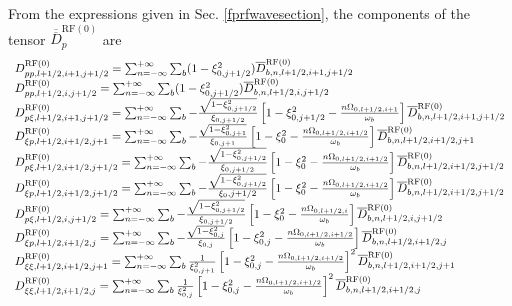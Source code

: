 From the expressions given in Sec. \ref{fprfwavesection}, the
components of the tensor
$\overline{\overline{D}}_{p}^{\text{RF}\left( 0\right) }$ are
\begin{equation}
\begin{array}{l}
D_{pp,l+1/2,i+1,j+1/2}^{\text{RF}\left( 0\right) }=\sum_{n=-\infty }^{+%
\infty }\sum_{b}(1-\xi _{0,j+1/2}^{2})\overline{D}_{b,n,l+1/2,i+1,j+1/2}^{%
\text{RF}(0)} \\
D_{pp,l+1/2,i,j+1/2}^{\text{RF}\left( 0\right) }=\sum_{n=-\infty }^{+\infty %
}\sum_{b}(1-\xi _{0,j+1/2}^{2})\overline{D}_{b,n,l+1/2,i,j+1/2}^{\text{RF}%
(0)} \\
D_{p\xi ,l+1/2,i+1,j+1/2}^{\text{RF}\left( 0\right) }=\sum_{n=-\infty }^{+%
\infty }\sum_{b}-\frac{\sqrt{1-\xi _{0,j+1/2}^{2}}}{\xi _{0,j+1/2}}\left[
1-\xi _{0,j+1/2}^{2}-\frac{n\Omega _{0,l+1/2,i+1}}{\omega _{b}}\right]
\overline{D}_{b,n,l+1/2,i+1,j+1/2}^{\text{RF}(0)} \\
D_{\xi p,l+1/2,i+1/2,j+1}^{\text{RF}\left( 0\right) }=\sum_{n=-\infty }^{+%
\infty }\sum_{b}-\frac{\sqrt{1-\xi _{0,j+1}^{2}}}{\xi _{0,j+1}}\left[ 1-\xi
_{0}^{2}-\frac{n\Omega _{0,l+1/2,i+1/2}}{\omega _{b}}\right] \overline{D}%
_{b,n,l+1/2,i+1/2,j+1}^{\text{RF}(0)} \\
D_{p\xi ,l+1/2,i+1/2,j+1/2}^{\text{RF}\left( 0\right) }=\sum_{n=-\infty }^{+%
\infty }\sum_{b}-\frac{\sqrt{1-\xi _{0,j+1/2}^{2}}}{\xi _{0,j+1/2}}\left[
1-\xi _{0}^{2}-\frac{n\Omega _{0,l+1/2,i+1/2}}{\omega _{b}}\right] \overline{%
D}_{b,n,l+1/2,i+1/2,j+1/2}^{\text{RF}(0)} \\
D_{\xi p,l+1/2,i+1/2,j+1/2}^{\text{RF}\left( 0\right) }=\sum_{n=-\infty }^{+%
\infty }\sum_{b}-\frac{\sqrt{1-\xi _{0,j+1/2}^{2}}}{\xi _{0},j+1/2}\left[
1-\xi _{0}^{2}-\frac{n\Omega _{0,l+1/2,i+1/2}}{\omega _{b}}\right] \overline{%
D}_{b,n,l+1/2,i+1/2,j+1/2}^{\text{RF}(0)} \\
D_{p\xi ,l+1/2,i,j+1/2}^{\text{RF}\left( 0\right) }=\sum_{n=-\infty }^{+%
\infty }\sum_{b}-\frac{\sqrt{1-\xi _{0,j+1/2}^{2}}}{\xi _{0,j+1/2}}\left[
1-\xi _{0}^{2}-\frac{n\Omega _{0,l+1/2,i}}{\omega _{b}}\right] \overline{D}%
_{b,n,l+1/2,i,j+1/2}^{\text{RF}(0)} \\
D_{\xi p,l+1/2,i+1/2,j}^{\text{RF}\left( 0\right) }=\sum_{n=-\infty }^{+%
\infty }\sum_{b}-\frac{\sqrt{1-\xi _{0,j}^{2}}}{\xi _{0,j}}\left[ 1-\xi
_{0,j}^{2}-\frac{n\Omega _{0,l+1/2,i+1/2}}{\omega _{b}}\right] \overline{D}%
_{b,n,l+1/2,i+1/2,j}^{\text{RF}(0)} \\
D_{\xi \xi ,l+1/2,i+1/2,j+1}^{\text{RF}\left( 0\right) }=\sum_{n=-\infty }^{+%
\infty }\sum_{b}\frac{1}{\xi _{0,j+1}^{2}}\left[ 1-\xi _{0,j}^{2}-\frac{n%
\Omega _{0,l+1/2,i+1/2}}{\omega _{b}}\right] ^{2}\overline{D}%
_{b,n,l+1/2,i+1/2,j+1}^{\text{RF}(0)} \\
D_{\xi \xi ,l+1/2,i+1/2,j}^{\text{RF}\left( 0\right) }=\sum_{n=-\infty }^{+%
\infty }\sum_{b}\frac{1}{\xi _{0,j}^{2}}\left[ 1-\xi _{0,j}^{2}-\frac{n%
\Omega _{0,l+1/2,i+1/2}}{\omega _{b}}\right] ^{2}\overline{D}%
_{b,n,l+1/2,i+1/2,j}^{\text{RF}(0)}
\end{array}
\end{equation}
